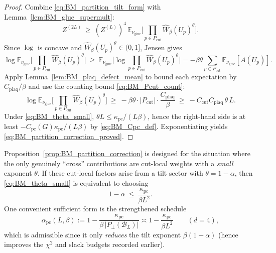 \begin{proof}
Combine \eqref{eq:BM_partition_tilt_form} with Lemma~\ref{lem:BM_glue_supermult}:
\[
Z^{(2L)} \ \ge\ (Z^{(L)})^4\,
\mathbb E_{\nu_{\mathrm{glue}}}\Big[\prod_{p\in P_{\mathrm{cut}}}\widehat W_\beta(U_p)^{\theta}\Big].
\]
Since $\log$ is concave and $\widehat W_\beta(U_p)^{\theta}\in(0,1]$, Jensen gives
\[
\log \mathbb E_{\nu_{\mathrm{glue}}}\Big[\prod_{p\in P_{\mathrm{cut}}}\widehat W_\beta(U_p)^{\theta}\Big]
\ \ge\
\mathbb E_{\nu_{\mathrm{glue}}}\Big[\log \prod_{p\in P_{\mathrm{cut}}}\widehat W_\beta(U_p)^{\theta}\Big]
=
-\beta\theta\sum_{p\in P_{\mathrm{cut}}}\mathbb E_{\nu_{\mathrm{glue}}}[A(U_p)].
\]
Apply Lemma~\ref{lem:BM_plaq_defect_mean} to bound each expectation by $C_{\mathrm{plaq}}/\beta$ and use
the counting bound \eqref{eq:BM_Pcut_count}:
\[
\log \mathbb E_{\nu_{\mathrm{glue}}}\Big[\prod_{p\in P_{\mathrm{cut}}}\widehat W_\beta(U_p)^{\theta}\Big]
\ \ge\
-\beta\theta\cdot |P_{\mathrm{cut}}|\cdot \frac{C_{\mathrm{plaq}}}{\beta}
\ \ge\
- C_{\mathrm{cut}}C_{\mathrm{plaq}}\,\theta\,L.
\]
Under \eqref{eq:BM_theta_small}, $\theta L\le \kappa_{\mathrm{pc}}/(L\beta)$, hence the right-hand side is at least
$-C_{\mathrm{pc}}(G)\kappa_{\mathrm{pc}}/(L\beta)$ by \eqref{eq:BM_Cpc_def}.
Exponentiating yields \eqref{eq:BM_partition_correction_proved}.
\end{proof}

\begin{remark}\label{rem:BM_theta_schedule}
Proposition~\ref{prop:BM_partition_correction} is designed for the situation where the only genuinely ``cross'' contributions are
cut-local weights with a \emph{small} exponent $\theta$.
If these cut-local factors arise from a tilt sector with $\theta=1-\alpha$, then \eqref{eq:BM_theta_small} is equivalent to choosing
\[
1-\alpha \ \le\ \frac{\kappa_{\mathrm{pc}}}{\beta L^2}.
\]
One convenient sufficient form is the strengthened schedule
\[
\alpha_{\mathrm{pc}}(L,\beta)
:=1-\frac{\kappa_{\mathrm{pc}}}{\beta\,|P_\perp(\mathcal B_L)|}
\asymp 1-\frac{\kappa_{\mathrm{pc}}}{\beta L^2}\qquad(d=4),
\]
which is admissible since it only \emph{reduces} the tilt exponent $\beta(1-\alpha)$ (hence improves the $\chi^2$ and slack budgets recorded
earlier).
\end{remark}


